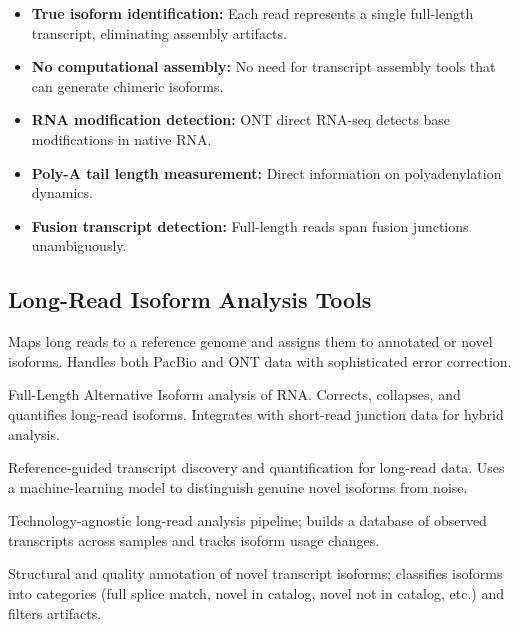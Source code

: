 \begin{keyconcept}[title={Advantages of Long-Read RNA-seq}]
\begin{itemize}[nosep]
  \item \textbf{True isoform identification:} Each read represents a single
    full-length transcript, eliminating assembly artifacts.
  \item \textbf{No computational assembly:} No need for transcript assembly
    tools that can generate chimeric isoforms.
  \item \textbf{RNA modification detection:} ONT direct RNA-seq detects
    base modifications in native RNA.
  \item \textbf{Poly-A tail length measurement:} Direct information on
    polyadenylation dynamics.
  \item \textbf{Fusion transcript detection:} Full-length reads span fusion
    junctions unambiguously.
\end{itemize}
\end{keyconcept}

\subsection{Long-Read Isoform Analysis Tools}

\begin{description}[style=nextline]
  \item[\software{IsoQuant}] Maps long reads to a reference genome and assigns
    them to annotated or novel isoforms. Handles both PacBio and ONT data with
    sophisticated error correction.
  \item[\software{FLAIR}] Full-Length Alternative Isoform analysis of RNA.
    Corrects, collapses, and quantifies long-read isoforms. Integrates with
    short-read junction data for hybrid analysis.
  \item[\software{Bambu}] Reference-guided transcript discovery and
    quantification for long-read data. Uses a machine-learning model to
    distinguish genuine novel isoforms from noise.
  \item[\software{TALON}] Technology-agnostic long-read analysis pipeline;
    builds a database of observed transcripts across samples and tracks
    isoform usage changes.
  \item[\software{SQANTI3}] Structural and quality annotation of novel
    transcript isoforms; classifies isoforms into categories (full splice
    match, novel in catalog, novel not in catalog, etc.) and filters
    artifacts.
\end{description}


